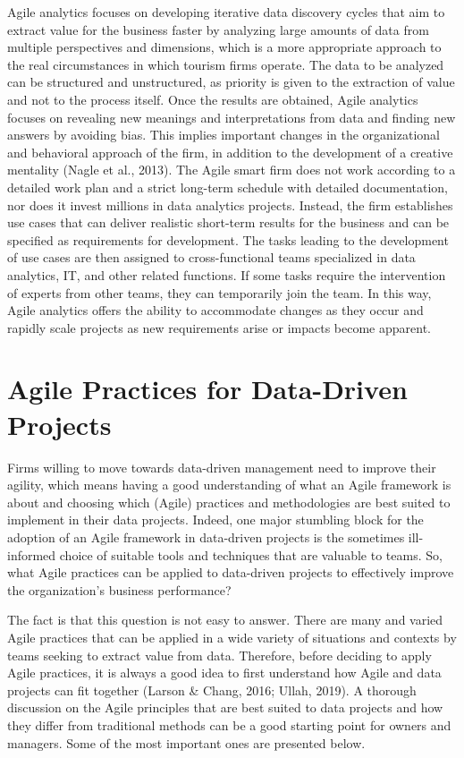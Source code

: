 \documentclass[
  letterpaper,
  DIV=11,
  numbers=noendperiod]{scrreprt}
\begin{document}
Agile analytics focuses on developing iterative data discovery cycles
that aim to extract value for the business faster by analyzing large
amounts of data from multiple perspectives and dimensions, which is a
more appropriate approach to the real circumstances in which tourism
firms operate. The data to be analyzed can be structured and
unstructured, as priority is given to the extraction of value and not to
the process itself. Once the results are obtained, Agile analytics
focuses on revealing new meanings and interpretations from data and
finding new answers by avoiding bias. This implies important changes in
the organizational and behavioral approach of the firm, in addition to
the development of a creative mentality (Nagle et al., 2013). The Agile
smart firm does not work according to a detailed work plan and a strict
long-term schedule with detailed documentation, nor does it invest
millions in data analytics projects. Instead, the firm establishes use
cases that can deliver realistic short-term results for the business and
can be specified as requirements for development. The tasks leading to
the development of use cases are then assigned to cross-functional teams
specialized in data analytics, IT, and other related functions. If some
tasks require the intervention of experts from other teams, they can
temporarily join the team. In this way, Agile analytics offers the
ability to accommodate changes as they occur and rapidly scale projects
as new requirements arise or impacts become apparent.

\hypertarget{agile-practices-for-data-driven-projects}{%
\section{Agile Practices for Data-Driven
Projects}\label{agile-practices-for-data-driven-projects}}

Firms willing to move towards data-driven management need to improve
their agility, which means having a good understanding of what an Agile
framework is about and choosing which (Agile) practices and
methodologies are best suited to implement in their data projects.
Indeed, one major stumbling block for the adoption of an Agile framework
in data-driven projects is the sometimes ill-informed choice of suitable
tools and techniques that are valuable to teams. So, what Agile
practices can be applied to data-driven projects to effectively improve
the organization's business performance?

The fact is that this question is not easy to answer. There are many and
varied Agile practices that can be applied in a wide variety of
situations and contexts by teams seeking to extract value from data.
Therefore, before deciding to apply Agile practices, it is always a good
idea to first understand how Agile and data projects can fit together
(Larson \& Chang, 2016; Ullah, 2019). A thorough discussion on the Agile
principles that are best suited to data projects and how they differ
from traditional methods can be a good starting point for owners and
managers. Some of the most important ones are presented below.
\end{document}
